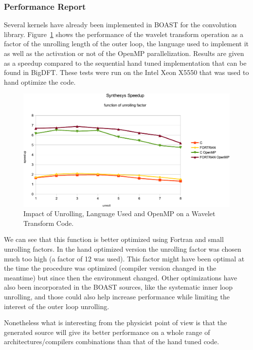 \documentclass{IEEEtran}
\begin{document}
    \subsubsection{Performance Report}

Several kernels have already been implemented in BOAST for the convolution
library. Figure~\ref{fig:synthesis} shows the performance of the wavelet
transform operation as a factor of the unrolling length of the outer loop, the
language used to implement it as well as the activation or not of the OpenMP
parallelization. Results are given as a speedup compared to the sequential hand
tuned implementation that can be found in BigDFT. These tests were run on the
Intel Xeon X5550 that was used to hand optimize the code.

\begin{figure}
\begin{center}
\includegraphics[width=\linewidth]{Res_synthesis}
\end{center}
\caption{Impact of Unrolling, Language Used and OpenMP on a Wavelet Transform Code.}
\label{fig:synthesis}
\end{figure}

We can see that this function is better optimized using Fortran and small
unrolling factors. In the hand optimized version the unrolling factor was chosen
much too high (a factor of 12 was used). This factor might have been optimal at
the time the procedure was optimized (compiler version changed in the meantime) but
since then the environment changed. Other optimizations have also been
incorporated in the BOAST sources, like the systematic inner loop unrolling, and
those could also help increase performance while limiting the interest of the
outer loop unrolling.

Nonetheless what is interesting from the physicist point of view is that the
generated source will give its better performance on a whole range of
architectures/compilers combinations than that of the hand tuned code.
\end{document}
